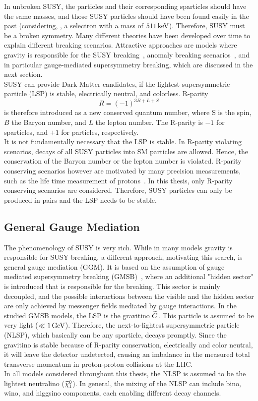 In unbroken SUSY, the particles and their corresponding sparticles should have the same masses, and those SUSY particles should have been found easily in the past (considering, \eg, a selectron with a mass of $511\,\text{ke\hspace{-.08em}V}$). Therefore, SUSY must be a broken symmetry. Many different theories have been developed over time to explain different breaking scenarios. Attractive approaches are models where gravity is responsible for the SUSY breaking~\cite{SUSYPrimer}, anomaly breaking scenarios~\cite{AMSB}, and in particular gauge-mediated supersymmetry breaking, which are discussed in the next section.\\
SUSY can provide Dark Matter candidates, if the lightest supersymmetric particle (LSP) is stable, electrically neutral, and colorless.
R-parity
\begin{equation}
 R = (-1)^{3B+L+S}
\end{equation}
is therefore introduced as a new conserved quantum number, where S is the spin, $B$ the Baryon number, and $L$ the lepton number. The R-parity is $-1$ for sparticles, and $+1$ for particles, respectively.\\
It is not fundamentally necessary that the LSP is stable. In R-parity violating scenarios, decays of all SUSY particles into SM particles are allowed. Hence, the conservation of the Baryon number or the lepton number is violated. R-parity conserving scenarios however are motivated by many precision measurements, such as the life time measurement of protons~\cite{ProtonDecay}.
In this thesis, only R-parity conserving scenarios are considered. Therefore, SUSY particles can only be produced in pairs and the LSP needs to be stable.\\



\subsection{General Gauge Mediation}\label{sec:GGM}
The phenomenology of SUSY is very rich. While in many models gravity is responsible for SUSY breaking, a different approach, motivating this search, is general gauge mediation (GGM). It is based on the assumption of gauge mediated supersymmetry breaking (GMSB)~\cite{GGM}, where an additional "hidden sector" is introduced that is responsible for the breaking. This sector is mainly decoupled, and the possible interactions between the visible and the hidden sector are only achieved by messenger fields mediated by gauge interactions. In the studied GMSB models, the LSP is the gravitino $\widetilde{G}$. This particle is assumed to be very light ($\ll1\,\text{Ge\hspace{-.08em}V}$). Therefore, the next-to-lightest supersymmetric particle (NLSP), which basically can be any sparticle, decays promptly. Since the gravitino is stable because of R-parity conservation, electrically and color neutral, it will leave the detector undetected, causing an imbalance in the measured total transverse momentum in proton-proton collisions at the LHC.\\
In all models considered throughout this thesis, the NLSP is assumed to be the lightest neutralino ($\widetilde{\chi}^{0}_{1}$). In general, the mixing of the NLSP can include bino, wino, and higgsino components, each enabling different decay channels.


